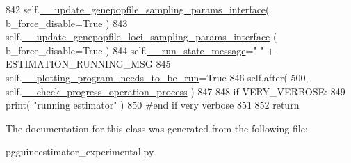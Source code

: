 \begin{DoxyCode}
842         self.\hyperlink{classnegui_1_1pgguineestimator__experimental_1_1PGGuiNeEstimator_a2b8aac1608bcf4cb91d46f23345ffbbe}{\_\_update\_genepopfile\_sampling\_params\_interface}( 
      b\_force\_disable=\textcolor{keyword}{True} )
843         self.\hyperlink{classnegui_1_1pgguineestimator__experimental_1_1PGGuiNeEstimator_a55683e0220823fdb0663e4b08e042cf2}{\_\_update\_genepopfile\_loci\_sampling\_params\_interface}
      ( b\_force\_disable=\textcolor{keyword}{True} )
844         self.\hyperlink{classnegui_1_1pgguineestimator__experimental_1_1PGGuiNeEstimator_adc90b53fb2b4c9aefbcc0391ce7451d7}{\_\_run\_state\_message}=\textcolor{stringliteral}{"  "} + ESTIMATION\_RUNNING\_MSG
845         self.\hyperlink{classnegui_1_1pgguineestimator__experimental_1_1PGGuiNeEstimator_ab9782b5b4071976681cfbd22a8504f87}{\_\_plotting\_program\_needs\_to\_be\_run}=\textcolor{keyword}{True} 
846         self.after( 500, self.\hyperlink{classnegui_1_1pgguineestimator__experimental_1_1PGGuiNeEstimator_aca3ec4fc8ec2a5872ef7e1b9048b5684}{\_\_check\_progress\_operation\_process} )
847 
848         \textcolor{keywordflow}{if} VERY\_VERBOSE:
849             print( \textcolor{stringliteral}{"running estimator"} )
850         \textcolor{comment}{#end if very verbose}
851 
852         \textcolor{keywordflow}{return}
\end{DoxyCode}


The documentation for this class was generated from the following file\+:\begin{DoxyCompactItemize}
\item 
pgguineestimator\+\_\+experimental.\+py\end{DoxyCompactItemize}

